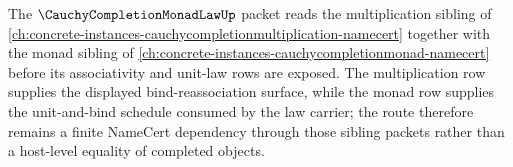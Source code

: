 The $\CauchyCompletionMonadLawUp$ packet reads the multiplication sibling of \autoref{ch:concrete-instances-cauchycompletionmultiplication-namecert} together with the monad sibling of \autoref{ch:concrete-instances-cauchycompletionmonad-namecert} before its associativity and unit-law rows are exposed. The multiplication row supplies the displayed bind-reassociation surface, while the monad row supplies the unit-and-bind schedule consumed by the law carrier; the route therefore remains a finite NameCert dependency through those sibling packets rather than a host-level equality of completed objects.
